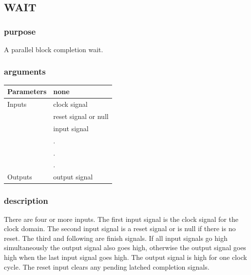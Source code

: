         \subsection{WAIT}

            \subsubsection{purpose}
            
                A parallel block completion wait.

            \subsubsection{arguments}
            
                \begin{tabular}{| l | l |}
                \hline
                Parameters  & none \\
                \hline
                Inputs      & clock signal \\
                            & reset signal or null \\
                            & input signal \\
                            & . \\
                            & . \\
                            & . \\
                \hline
                Outputs     & output signal \\
                \hline
                \end{tabular}

            \subsubsection{description}

                There are four or more inputs. The first input signal is the clock
                signal for the clock domain. The second input signal is a reset
                signal or is null if there is no reset. The third and following are
                finish signals. If all input signals go high simultaneously the
                output signal also goes high, otherwise the output signal goes high
                when the last input signal goes high. The output signal is high for
                one clock cycle. The reset input clears any pending latched
                completion signals.

